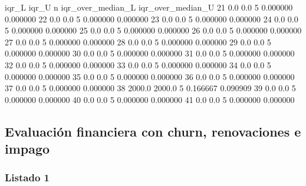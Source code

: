 \begin{APACode}
     iqr_L   iqr_U  n  iqr_over_median_L  iqr_over_median_U  
21     0.0     0.0  5           0.000000           0.000000  
22     0.0     0.0  5           0.000000           0.000000  
23     0.0     0.0  5           0.000000           0.000000  
24     0.0     0.0  5           0.000000           0.000000  
25     0.0     0.0  5           0.000000           0.000000  
26     0.0     0.0  5           0.000000           0.000000  
27     0.0     0.0  5           0.000000           0.000000  
28     0.0     0.0  5           0.000000           0.000000  
29     0.0     0.0  5           0.000000           0.000000  
30     0.0     0.0  5           0.000000           0.000000  
31     0.0     0.0  5           0.000000           0.000000  
32     0.0     0.0  5           0.000000           0.000000  
33     0.0     0.0  5           0.000000           0.000000  
34     0.0     0.0  5           0.000000           0.000000  
35     0.0     0.0  5           0.000000           0.000000  
36     0.0     0.0  5           0.000000           0.000000  
37     0.0     0.0  5           0.000000           0.000000  
38  2000.0  2000.0  5           0.166667           0.090909  
39     0.0     0.0  5           0.000000           0.000000  
40     0.0     0.0  5           0.000000           0.000000  
41     0.0     0.0  5           0.000000           0.000000  
\end{APACode}

\subsection{Evaluación financiera con churn, renovaciones e impago}

\subsubsection{Listado 1}
\label{anexo:code-6-5-1-1-1}

